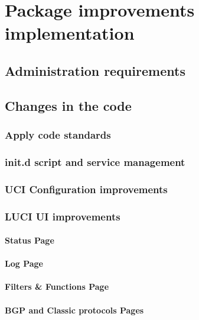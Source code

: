 \chapter{Package improvements implementation}
\label{ch:implementation}
\pagestyle{headings}


\section{Administration requirements}

\section{Changes in the code}

\subsection{Apply code standards}

\subsection{init.d script and service management}

\subsection{UCI Configuration improvements}

\subsection{LUCI UI improvements}

\subsubsection{Status Page}

\subsubsection{Log Page}

\subsubsection{Filters \& Functions Page}

\subsubsection{BGP and Classic protocols Pages}

